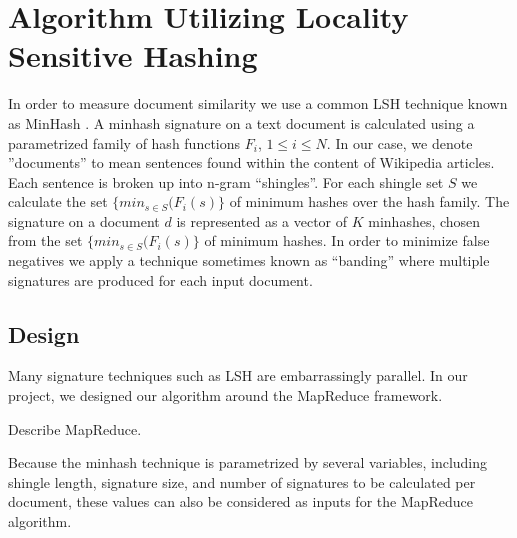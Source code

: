 \documentclass{acm_proc_article-sp}
\begin{document}
\section{Algorithm Utilizing Locality Sensitive Hashing}


In order to measure document similarity we use a common LSH technique known as MinHash \cite{}. A minhash signature on a text document is calculated using a parametrized family of hash functions $F_i$, $1 \le i \le N$. In our case, we denote ''documents'' to mean sentences found within the content of Wikipedia articles. Each sentence is broken up into n-gram ``shingles''. For each shingle set $S$ we calculate the set $\{min_{s \in S}(F_i(s)\}$ of minimum hashes over the hash family. The signature on a document $d$ is represented as a vector of $K$ minhashes, chosen from the set $\{min_{s \in S}(F_i(s)\}$ of minimum hashes. In order to minimize false negatives we apply a technique sometimes known as ``banding'' \cite{ullman:massive} where multiple signatures are produced for each input document.

\subsection{Design}
Many signature techniques such as LSH are embarrassingly parallel. In our project, we designed our algorithm around the MapReduce framework.

Describe MapReduce.

Because the minhash technique is parametrized by several variables, including shingle length, signature size, and number of signatures to be calculated per document, these values can also be considered as inputs for the MapReduce algorithm.
\end{document}
